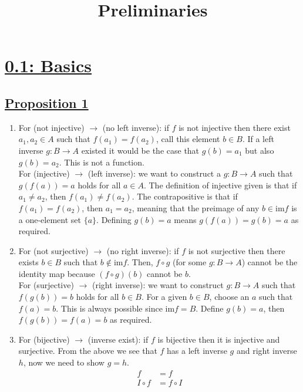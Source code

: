 \documentclass[]{article}
\title{Preliminaries}
\author{}
\date{}
\begin{document}
\maketitle
\vspace{-5em}

\section*{\underline{0.1: Basics}}

\subsection*{\underline{Proposition 1}}
\begin{enumerate}
\item For (not injective) $\rightarrow$ (no left inverse): if $f$ is not injective then there exist $a_1,a_2 \in A$ such that $f(a_1) = f(a_2)$, call this element $b \in B$. If a left inverse $g: B \to A$ existed it would be the case that $g(b) = a_1$ but also $g(b) = a_2$. This is not a function. \\
For (injective) $\rightarrow$ (left inverse): we want to construct a $g:B\to A$ such that $g(f(a)) = a$ holds for all $a \in A$. The definition of injective given is that if $a_1 \neq a_2$, then $f(a_1) \neq f(a_2)$. The contrapositive is that if $f(a_1) = f(a_2)$, then $a_1 = a_2$, meaning that the preimage of any $b \in \text{im}f$ is a one-element set $\{a\}$. Defining $g(b) = a$ means $g(f(a)) = g(b) = a$ as required.
\item For (not surjective) $\rightarrow$ (no right inverse): if $f$ is not surjective then there exists $b \in B$ such that $b \notin \text{im}f$. Then, $f \circ g$ (for some $g: B \to A$) cannot be the identity map because $(f \circ g)(b)$ cannot be $b$. \\ For (surjective) $\rightarrow$ (right inverse): we want to construct $g: B\to A$ such that $f(g(b)) = b$ holds for all $b \in B$. For a given $b \in B$, choose an $a$ such that $f(a) = b$. This is always possible since $\text{im}f = B$. Define $g(b) = a$, then $f(g(b)) = f(a) = b$ as required.
\item For (bijective) $\rightarrow$ (inverse exist): if $f$ is bijective then it is injective and surjective. From the above we see that $f$ has a left inverse $g$ and right inverse $h$, now we need to show $g=h$.
\begin{align}
f &= f \\
I \circ f &= f \circ I \\

\end{align}
\end{enumerate}
\end{document}
